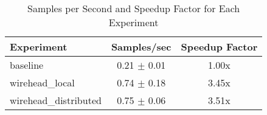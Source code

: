 
\begin{table}[h]
\centering
\begin{tabular}{lcc}
\hline
Experiment & Samples/sec & Speedup Factor \\
\hline
baseline & 0.21 $\pm$ 0.01 & 1.00x \\
wirehead\_local & 0.74 $\pm$ 0.18 & 3.45x \\
wirehead\_distributed & 0.75 $\pm$ 0.06 & 3.51x \\
\hline
\end{tabular}
\caption{Samples per Second and Speedup Factor for Each Experiment}
\label{tab:samples_per_second}
\end{table}
